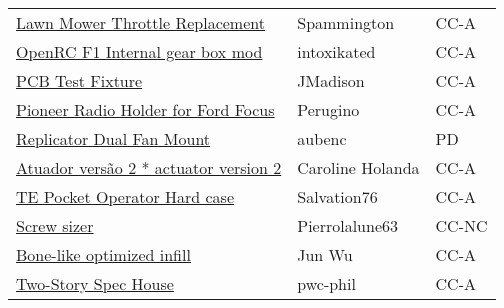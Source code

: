 \begin{table}
\begin{tabular}{l l l}
\href{	https://www.thingiverse.com/thing:2752165	}{	Lawn Mower Throttle Replacement	} & 	Spammington	 & 	CC-A	\\
\href{	https://www.thingiverse.com/thing:2854328	}{	OpenRC F1 Internal gear box mod	} & 	intoxikated	 & 	CC-A	\\
\href{	https://www.thingiverse.com/thing:3592328	}{	PCB Test Fixture	} & 	JMadison	 & 	CC-A	\\
\href{	https://www.thingiverse.com/thing:1078865	}{	Pioneer Radio Holder for Ford Focus	} & 	Perugino	 & 	CC-A	\\
\href{	https://www.thingiverse.com/thing:34596	}{	Replicator Dual Fan Mount	} & 	aubenc	 & 	PD	\\
\href{	https://www.thingiverse.com/thing:3754728	}{	Atuador vers\~ao 2 * actuator version 2	} & 	Caroline Holanda	 & 	CC-A	\\
\href{	https://www.thingiverse.com/thing:1595179	}{	TE Pocket Operator Hard case	} & 	Salvation76	 & 	CC-A	\\
\href{	https://www.thingiverse.com/thing:3682303	}{	Screw sizer	} & 	Pierrolalune63	 & 	CC-NC	\\
\href{	http://homepage.tudelft.nl/z0s1z/projects/2017-bone-infill.html	}{	Bone-like optimized infill	} & 	Jun Wu	 & 	CC-A	\\
\href{	https://www.thingiverse.com/thing:26244	}{	Two-Story Spec House	} & 	pwc-phil	 & 	CC-A	\\
\end{tabular}
\end{table}
